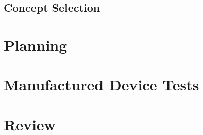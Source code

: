 \documentclass{article}
\begin{document}
\subsection{Concept Selection}

\newpage

\section{Planning}

\newpage

\section{Manufactured Device Tests}


\section{Review}
\end{document}
